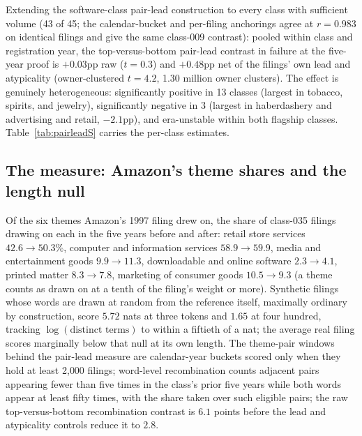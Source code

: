 Extending the software-class pair-lead construction to every class with
sufficient volume (43 of 45; the calendar-bucket and per-filing
anchorings agree at $r = 0.983$ on identical filings and give the same
class-009 contrast): pooled within class and registration year, the
top-versus-bottom pair-lead contrast in failure at the five-year proof
is $+0.03$pp raw ($t = 0.3$) and $+0.48$pp net of the filings' own lead
and atypicality (owner-clustered $t = 4.2$, 1.30 million owner
clusters). The effect is genuinely heterogeneous: significantly positive
in 13 classes (largest in tobacco, spirits, and jewelry), significantly
negative in 3 (largest in haberdashery and advertising and retail,
$-2.1$pp), and era-unstable within both flagship classes.
Table~\ref{tab:pairleadS} carries the per-class estimates.

\begin{table}[h]\centering\footnotesize
\caption{Pair-lead contrasts at the five-year proof by class: settled
registrations, top-minus-bottom pair-lead quintile within class and
registration year, raw and net of lead and atypicality.}
\label{tab:pairleadS}

\end{table}

\subsection{The measure: Amazon's theme shares and the length null}

Of the six themes Amazon's 1997 filing drew on, the share of class-035
filings drawing on each in the five years before and after: retail store
services $42.6 \to 50.3$\%, computer and information services
$58.9 \to 59.9$, media and entertainment goods $9.9 \to 11.3$,
downloadable and online software $2.3 \to 4.1$, printed matter
$8.3 \to 7.8$, marketing of consumer goods $10.5 \to 9.3$ (a theme counts
as drawn on at a tenth of the filing's weight or more). Synthetic filings
whose words are drawn at random from the reference itself, maximally
ordinary by construction, score $5.72$ nats at three tokens and $1.65$ at
four hundred, tracking $\log(\text{distinct terms})$ to within a fiftieth
of a nat; the average real filing scores marginally below that null at
its own length. The theme-pair windows behind the pair-lead measure are
calendar-year buckets scored only when they hold at least 2{,}000
filings; word-level recombination counts adjacent pairs appearing fewer
than five times in the class's prior five years while both words appear
at least fifty times, with the share taken over such eligible pairs; the
raw top-versus-bottom recombination contrast is $6.1$ points before the
lead and atypicality controls reduce it to $2.8$.